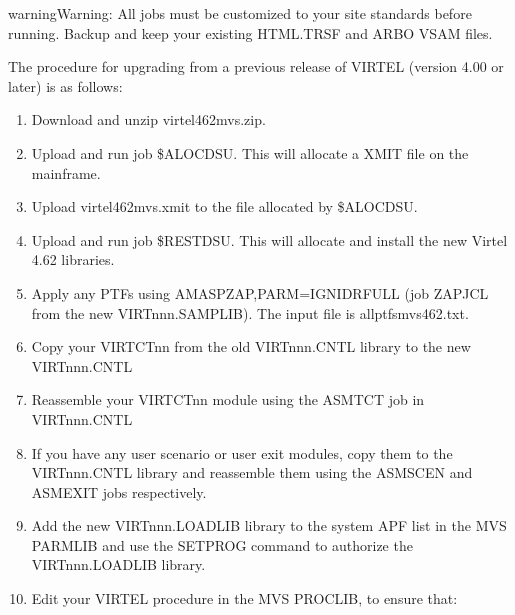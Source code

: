 \documentclass[letterpaper,10pt,english]{sphinxmanual}
\begin{document}
\begin{sphinxadmonition}{warning}{Warning:}
\sphinxAtStartPar
All jobs must be customized to your site standards before running. Backup and keep your existing HTML.TRSF and ARBO VSAM files.
\end{sphinxadmonition}

\sphinxAtStartPar
The procedure for upgrading from a previous release of VIRTEL (version 4.00 or later) is as follows:
\begin{enumerate}
%
\item {} 
\sphinxAtStartPar
Download and unzip virtel462mvs.zip.

\item {} 
\sphinxAtStartPar
Upload and run job \$ALOCDSU. This will allocate a XMIT file on the mainframe.

\item {} 
\sphinxAtStartPar
Upload virtel462mvs.xmit to the file allocated by \$ALOCDSU.

\item {} 
\sphinxAtStartPar
Upload and run job \$RESTDSU. This will allocate and install the new Virtel 4.62 libraries.

\item {} 
\sphinxAtStartPar
Apply any PTFs using AMASPZAP,PARM=IGNIDRFULL (job ZAPJCL from the new VIRTnnn.SAMPLIB). The input file is allptfs\sphinxhyphen{}mvs462.txt.

\item {} 
\sphinxAtStartPar
Copy your VIRTCTnn from the old VIRTnnn.CNTL library to the new VIRTnnn.CNTL

\item {} 
\sphinxAtStartPar
Reassemble your VIRTCTnn module using the ASMTCT job in VIRTnnn.CNTL

\item {} 
\sphinxAtStartPar
If you have any user scenario or user exit modules, copy them to the VIRTnnn.CNTL library and reassemble them using the ASMSCEN and ASMEXIT jobs respectively.

\item {} 
\sphinxAtStartPar
Add the new VIRTnnn.LOADLIB library to the system APF list in the MVS PARMLIB and use the SETPROG command to authorize the VIRTnnn.LOADLIB library.

\item {} 
\sphinxAtStartPar
Edit your VIRTEL procedure in the MVS PROCLIB, to ensure that:

\end{enumerate}
\end{document}
